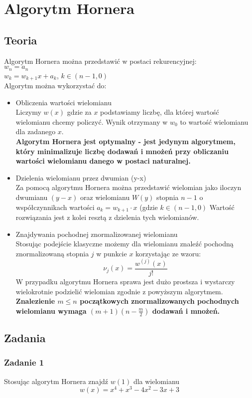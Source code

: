 \documentclass[a4paper]{article}
\begin{document}
\section{Algorytm Hornera}
\subsection{Teoria}
Algorytm Hornera można przedstawić w postaci rekurencyjnej:\\
$w_n = a_n$ \\
$w_k = w_{k+1}x+a_k$, $k\in(n-1,0)$\\
Algorytm można wykorzystać do:
\begin{itemize}
\item Obliczenia wartości wielomianu\\
Liczymy $w(x)$ gdzie za $x$ podstawiamy liczbę, dla której wartość wielomianu chcemy policzyć.
Wynik otrzymany w $w_0$ to wartość wielomianu dla zadanego $x$.\\
\textbf{Algorytm Hornera jest optymalny - jest jedynym algorytmem, który minimalizuje liczbę dodawań i mnożeń przy obliczaniu wartości wielomianu danego w postaci naturalnej.}

\item Dzielenia wielomianu przez dwumian (y-x)\\
Za pomocą algorytmu Hornera można przedstawić wielomian jako iloczyn dwumianu $(y-x)$ oraz wielomianu $W(y)$ stopnia $n-1$ o współczynnikach wartości $a_k = w_{k+1}\cdot x$ (gdzie $k \in (n-1, 0)$ Wartość rozwiązania jest z kolei resztą z dzielenia tych wielomianów.

\item Znajdywania pochodnej znormalizowanej wielomianu\\
Stosując podejście klasyczne możemy dla wielomianu znaleźć pochodną znormalizowaną stopnia $j$ w punkcie $x$ korzystając ze wzoru:
$$\nu_j(x) = \frac{w^{(j)}(x)}{j!}$$
W przypadku algorytmu Hornera sprawa jest dużo prostsza i wystarczy wielokrotnie podzielić wielomian zgodnie z powyższym algorytmem.
\textbf{Znalezienie $m \leq n$ początkowych znormalizowanych pochodnych wielomianu wymaga $(m+1)\left(n-\frac{m}{2}\right)$ dodawań i mnożeń.}
\end{itemize}
\subsection{Zadania}
\subsubsection*{Zadanie 1}
Stosując algorytm Hornera znajdź $w(1)$ dla wielomianu
$$w(x)=x^4+x^3-4x^2-3x+3$$
\end{document}
